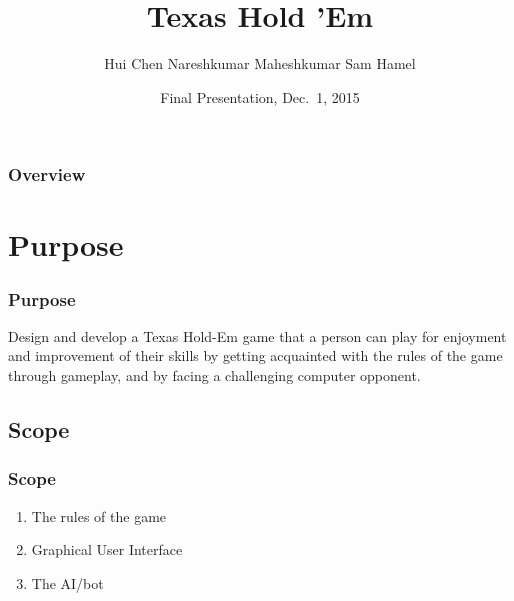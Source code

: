 \documentclass{beamer}
\title[\pgfuseimage{logo}]
{Texas Hold 'Em}
\author[Slide \thepage~of \pageref{TotPages}]
{Hui Chen \newline Nareshkumar Maheshkumar \newline Sam Hamel}
\institute[McMaster University]
{
  Computing and Software Department\\
  Faculty of Engineering\\
  McMaster University
}
\date[Dec 1, 2015] 
{Final Presentation, Dec.\ 1, 2015}
\begin{document}
\begin{frame}

\titlepage

\end{frame}


\begin{frame}

\frametitle{Overview}
\tableofcontents

\end{frame}


\section[Purpose]{Purpose}


\begin{frame}

\frametitle{Purpose}

\begin{normalsize}
Design and develop a Texas Hold-Em game
that a person can play for enjoyment and improvement of their skills by
getting acquainted with the rules of the game through gameplay,
and by facing a challenging computer opponent. 
\end{normalsize}
\end{frame}


\begin{frame}

\section[Scope]{Scope}


\frametitle{Scope}

\begin{enumerate}
\item The rules of the game
\item Graphical User Interface
\item The AI/bot
\end{enumerate}

\end{frame}

\end{document}
